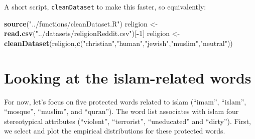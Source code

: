 \documentclass[12pt,]{book}
\newenvironment{Shaded}{\begin{snugshade}}{\end{snugshade}}
\newcommand{\KeywordTok}[1]{\textcolor[rgb]{0.13,0.29,0.53}{\textbf{#1}}}
\newcommand{\DecValTok}[1]{\textcolor[rgb]{0.00,0.00,0.81}{#1}}
\newcommand{\StringTok}[1]{\textcolor[rgb]{0.31,0.60,0.02}{#1}}
\newcommand{\OperatorTok}[1]{\textcolor[rgb]{0.81,0.36,0.00}{\textbf{#1}}}
\newcommand{\NormalTok}[1]{#1}
\begin{document}
\vspace{1mm} \footnotesize

\begin{Shaded}
\end{Shaded}

\normalsize

A short script, \texttt{cleanDataset} to make this faster, so
equivalently:

\vspace{1mm} \footnotesize

\begin{Shaded}
\begin{Highlighting}[]
\KeywordTok{source}\NormalTok{(}\StringTok{"../functions/cleanDataset.R"}\NormalTok{)}
\NormalTok{religion <-}\StringTok{ }\KeywordTok{read.csv}\NormalTok{(}\StringTok{"../datasets/religionReddit.csv"}\NormalTok{)[}\OperatorTok{-}\DecValTok{1}\NormalTok{]}
\NormalTok{religion <-}\StringTok{ }\KeywordTok{cleanDataset}\NormalTok{(religion,}\KeywordTok{c}\NormalTok{(}\StringTok{"christian"}\NormalTok{,}\StringTok{"human"}\NormalTok{,}\StringTok{"jewish"}\NormalTok{,}\StringTok{"muslim"}\NormalTok{,}\StringTok{"neutral"}\NormalTok{))}
\end{Highlighting}
\end{Shaded}

\normalsize

\section{Looking at the islam-related
words}\label{looking-at-the-islam-related-words}

For now, let's focus on five protected words related to islam (``imam'',
``islam'', ``mosque'', ``muslim'', and ``quran''). The word list
associates with islam four stereotypical attributes (``violent'',
``terrorist'', ``uneducated'' and ``dirty''). First, we select and plot
the empirical distributions for these protected words.
\end{document}
